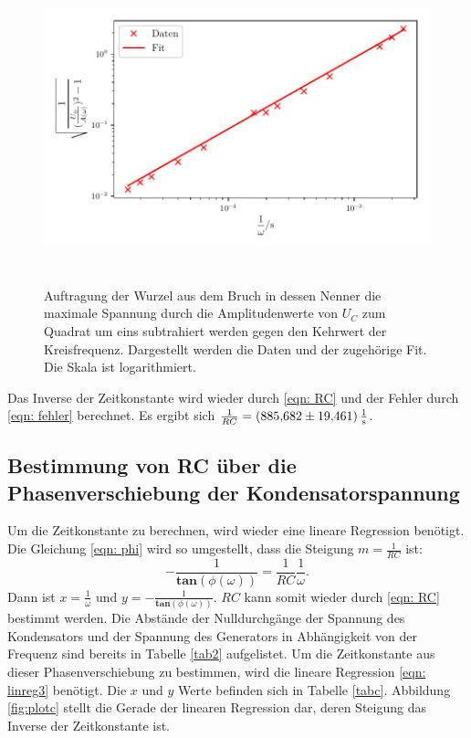 \begin{figure}
  \centering
  \includegraphics[width=13cm, height=9cm]{build/plotb.pdf}
  \caption{Auftragung der Wurzel aus dem Bruch in dessen Nenner die maximale Spannung durch die Amplitudenwerte von 
  $U_{C}$ zum Quadrat um eins subtrahiert werden gegen den Kehrwert der Kreisfrequenz. Dargestellt werden die Daten 
  und der zugehörige Fit. Die Skala ist logarithmiert.}
  \label{fig:plotb}
\end{figure}

\noindent Das Inverse der Zeitkonstante wird wieder durch \eqref{eqn: RC} und der Fehler durch \eqref{eqn: fehler}
berechnet. Es ergibt sich $\frac{1}{RC} = \SI[per-mode=fraction]{885.682  \pm 19.461}{\per\second}$.

\subsection{Bestimmung von RC über die Phasenverschiebung der Kondensatorspannung}
\label{sec: c}
Um die Zeitkonstante zu berechnen, wird wieder eine lineare Regression benötigt.
Die Gleichung \eqref{eqn: phi} wird so umgestellt, dass die Steigung $m = \frac{1}{RC}$ ist:
\begin{equation}
    -\frac{1}{\mathbf{tan}(\phi(\omega))} = \frac{1}{RC} \frac{1}{\omega}.
    \label{eqn: linreg3} 
\end{equation}
Dann ist $x= \frac{1}{\omega}$ und $y= -\frac{1}{\mathbf{tan}(\phi(\omega))}$.
$RC$ kann somit wieder durch \eqref{eqn: RC} bestimmt werden.
\newline
Die Abstände der Nulldurchgänge der Spannung des Kondensators und der Spannung des Generators in Abhängigkeit
von der Frequenz sind bereits in Tabelle \ref{tab2} aufgelistet.
Um die Zeitkonstante aus dieser Phasenverschiebung zu bestimmen, wird die lineare Regression \eqref{eqn: linreg3} benötigt.
Die $x$ und $y$ Werte befinden sich in Tabelle \ref{tabc}. Abbildung \ref{fig:plotc} stellt die Gerade der
linearen Regression dar, deren Steigung das Inverse der Zeitkonstante ist.


